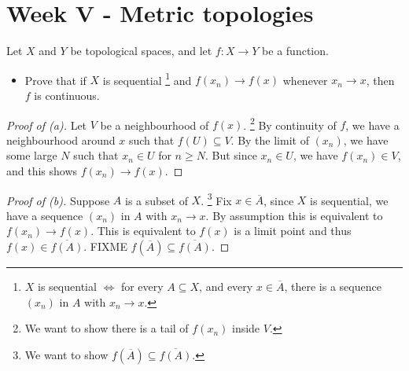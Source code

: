 \documentclass[../../main.tex]{subfiles}
\begin{document}
\section{Week V - Metric topologies}

\begin{problem}[4]
    Let $X$ and $Y$ be topological spaces, and let $f : X \to Y$ be a function.
    \begin{itemize}
        \item[(b)] Prove that if $X$ is sequential
            \footnote{$X$ is sequential $\Leftrightarrow$ for every $A \subseteq X$, and every $x \in \overline{A}$, there is a sequence $(x_n)$ in $A$ with $x_n \to x$.}
            and $f(x_n) \to f(x)$ whenever $x_n \to x$, then $f$ is continuous.
    \end{itemize}
\end{problem}

\begin{proof}[Proof of (a)]
    Let $V$ be a neighbourhood of $f(x)$.
    \footnote{We want to show there is a tail of $f(x_n)$ inside $V$.}
    By continuity of $f$, we have a neighbourhood around $x$ such that $f(U) \subseteq V$.
    By the limit of $(x_n)$, we have some large $N$ such that $x_n \in U$ for $n \ge N$.
    But since $x_n \in U$, we have $f(x_n) \in V$, and this shows $f(x_n) \to f(x)$.
\end{proof}

\begin{proof}[Proof of (b)]
    Suppose $A$ is a subset of $X$.
    \footnote{We want to show $f(\overline{A}) \subseteq \overline{f(A)}$.}
    Fix $x \in \overline{A}$, since $X$ is sequential, we have a sequence $(x_n)$ in $A$ with $x_n \to x$.
    By assumption this is equivalent to $f(x_n) \to f(x)$.
    This is equivalent to $f(x)$ is a limit point and thus $f(x) \in \overline{f(A)}$.
    FIXME $f(\overline{A}) \subseteq \overline{f(A)}$.
\end{proof}
\end{document}

